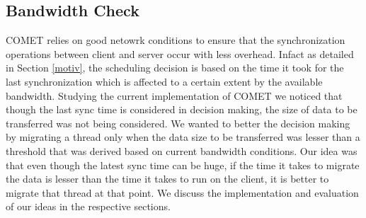 \subsection{Bandwidth Check}
COMET relies on good netowrk conditions to ensure that the synchronization operations between client and server occur with less overhead. Infact as detailed in Section \ref{motiv}, the scheduling decision is based on the time it took for the last synchronization which is affected to a certain extent by the available bandwidth. Studying the current implementation of COMET we noticed that though the last sync time is considered in decision making, the size of data to be transferred was not being considered. We wanted to better the decision making by migrating a thread only when the data size to be transferred was lesser than a threshold that was derived based on current bandwidth conditions. Our idea was that even though the latest sync time can be huge, if the time it takes to migrate the data is lesser than the time it takes to run on the client, it is better to migrate that thread at that point. We discuss the implementation and evaluation of our ideas in the respective sections.
